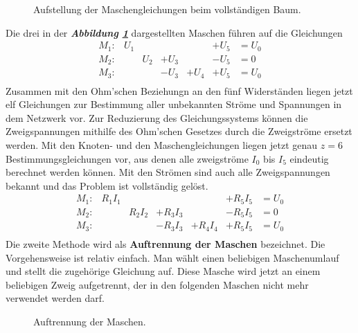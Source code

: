 \begin{figure}[H]
\centering
\caption{Aufstellung der Maschengleichungen beim vollständigen Baum.}
\label{fig_IIIjj}
\end{figure}
Die drei in der \textbf{\textit{Abbildung \ref{fig_IIIjj}}} dargestellten Maschen führen auf die Gleichungen
\begin{equation}
\boxed{
\begin{array}{lllllll}
M_1:&U_1&&&&+U_5&=U_0\\    
M_2:&&U_2&+U_3&&-U_5&=0\\    
M_3:&&&-U_3&+U_4&+U_5&=U_0\\    
\end{array}
}
\end{equation}
Zusammen mit den Ohm'schen Beziehungn an den fünf Widerständen liegen jetzt elf Gleichungen zur Bestimmung aller unbekannten Ströme und Spannungen in dem Netzwerk vor. Zur Reduzierung des Gleichungssystems können die Zweigspannungen mithilfe des Ohm'schen Gesetzes durch die Zweigströme ersetzt werden. Mit den Knoten- und den Maschengleichungen liegen jetzt genau $z=6$ Bestimmungsgleichungen vor, aus denen alle zweigströme $I_0$ bis $I_5$ eindeutig berechnet werden können. Mit den Strömen sind auch alle Zweigspannungen bekannt und das Problem ist vollständig gelöst.
\begin{equation}
\boxed{
\begin{array}{lllllll}
M_1:&R_1I_1&&&&+R_5I_5&=U_0\\    
M_2:&&R_2I_2&+R_3I_3&&-R_5I_5&=0\\    
M_3:&&&-R_3I_3&+R_4I_4&+R_5I_5&=U_0\\    
\end{array}
}
\end{equation} 
Die zweite Methode wird als \textbf{Auftrennung der Maschen} bezeichnet. Die Vorgehensweise ist relativ einfach. Man wählt einen beliebigen Maschenumlauf und stellt die zugehörige Gleichung auf. Diese Masche wird jetzt an einem beliebigen Zweig aufgetrennt, der in den folgenden Maschen nicht mehr verwendet werden darf. 
\begin{figure}[H]
\centering
\caption{Auftrennung der Maschen.}
\label{fig_IIIkk}
\end{figure}

